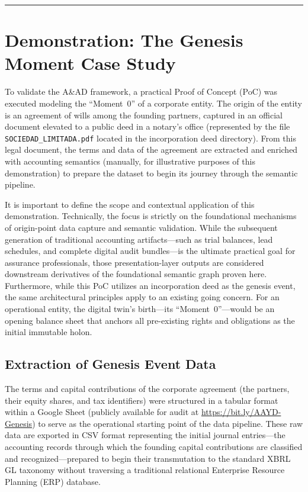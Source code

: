 \documentclass[12pt, a4paper]{article}
\begin{document}
\hrule
\vspace{1em}

\section{Demonstration: The Genesis Moment Case Study}

To validate the A\&AD framework, a practical Proof of Concept (PoC) was executed modeling the ``Moment~0'' of a corporate entity. The origin of the entity is an agreement of wills among the founding partners, captured in an official document elevated to a public deed in a notary's office (represented by the file \texttt{SOCIEDAD\_LIMITADA.pdf} located in the incorporation deed directory). From this legal document, the terms and data of the agreement are extracted and enriched with accounting semantics (manually, for illustrative purposes of this demonstration) to prepare the dataset to begin its journey through the semantic pipeline.

It is important to define the scope and contextual application of this demonstration. Technically, the focus is strictly on the foundational mechanisms of origin-point data capture and semantic validation. While the subsequent generation of traditional accounting artifacts---such as trial balances, lead schedules, and complete digital audit bundles---is the ultimate practical goal for assurance professionals, those presentation-layer outputs are considered downstream derivatives of the foundational semantic graph proven here. Furthermore, while this PoC utilizes an incorporation deed as the genesis event, the same architectural principles apply to an existing going concern. For an operational entity, the digital twin's birth---its ``Moment~0''---would be an opening balance sheet that anchors all pre-existing rights and obligations as the initial immutable holon.

\subsection{Extraction of Genesis Event Data}

The terms and capital contributions of the corporate agreement (the partners, their equity shares, and tax identifiers) were structured in a tabular format within a Google Sheet (publicly available for audit at \url{https://bit.ly/AAYD-Genesis}) to serve as the operational starting point of the data pipeline. These raw data are exported in CSV format representing the initial journal entries---the accounting records through which the founding capital contributions are classified and recognized---prepared to begin their transmutation to the standard XBRL GL taxonomy without traversing a traditional relational Enterprise Resource Planning (ERP) database.
\end{document}
